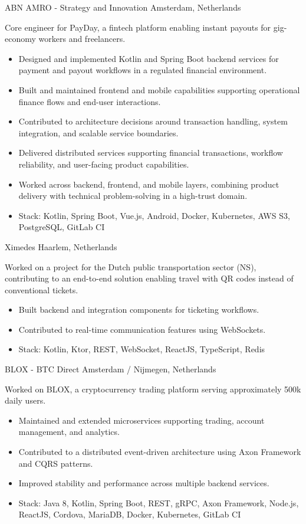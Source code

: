 \documentclass[10pt,a4paper,sans]{moderncv} %
\begin{document}
{ABN AMRO - Strategy and Innovation}
{Amsterdam, Netherlands}
{}{
Core engineer for PayDay, a fintech platform enabling instant payouts for gig-economy workers and freelancers.
\begin{itemize}
 \item Designed and implemented Kotlin and Spring Boot backend services for payment and payout workflows in a regulated financial environment.
 \item Built and maintained frontend and mobile capabilities supporting operational finance flows and end-user interactions.
 \item Contributed to architecture decisions around transaction handling, system integration, and scalable service boundaries.
 \item Delivered distributed services supporting financial transactions, workflow reliability, and user-facing product capabilities.
 \item Worked across backend, frontend, and mobile layers, combining product delivery with technical problem-solving in a high-trust domain.
 \item Stack: Kotlin, Spring Boot, Vue.js, Android, Docker, Kubernetes, AWS S3, PostgreSQL, GitLab CI
\end{itemize}
}

{Ximedes}
{Haarlem, Netherlands}
{}{
Worked on a project for the Dutch public transportation sector (NS), contributing to an end-to-end solution enabling travel with QR codes instead of conventional tickets.
\begin{itemize}
 \item Built backend and integration components for ticketing workflows.
 \item Contributed to real-time communication features using WebSockets.
 \item Stack: Kotlin, Ktor, REST, WebSocket, ReactJS, TypeScript, Redis
\end{itemize}
}

{BLOX - BTC Direct}
{Amsterdam / Nijmegen, Netherlands}
{}{
Worked on BLOX, a cryptocurrency trading platform serving approximately 500k daily users.
\begin{itemize}
 \item Maintained and extended microservices supporting trading, account management, and analytics.
 \item Contributed to a distributed event-driven architecture using Axon Framework and CQRS patterns.
 \item Improved stability and performance across multiple backend services.
 \item Stack: Java 8, Kotlin, Spring Boot, REST, gRPC, Axon Framework, Node.js, ReactJS, Cordova, MariaDB, Docker, Kubernetes, GitLab CI
\end{itemize}
}
\end{document}
